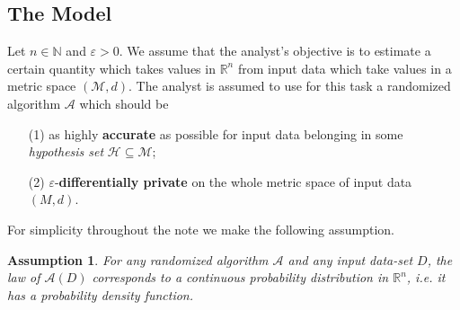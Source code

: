 \documentclass[12pt,a4paper]{article}
\newtheorem{assumption}{Assumption}
\numberwithin{equation}{section}
\numberwithin{equation}{section}
\renewcommand{\epsilon}{\varepsilon}
\newcommand{\1}{{\text{\Large $\mathfrak 1$}}}
\newcommand{\2}[1]{{\text{\Large $\mathfrak 1$}\!\left(#1\right)}}
\begin{document}
\subsection*{The Model}
Let $n \in \mathbb{N}$ and $\epsilon>0$. We assume that the analyst's objective is to estimate a certain quantity which takes values in $ \mathbb{R}^n$ from input data which take values in a metric space $(\mathcal{M},d)$. The analyst is assumed to use for this task a randomized algorithm $\mathcal{A}$ which should be \begin{itemize}
\item[(1)] as highly \textbf{accurate} as possible for input data belonging in some \textit{hypothesis set} $\mathcal{H} \subseteq \mathcal{M}$;

\item[(2)] $\epsilon$-\textbf{differentially private} on the whole metric space of input data $(M,d)$.
\end{itemize}For simplicity throughout the note we make the following assumption.\begin{assumption} For any randomized algorithm $\mathcal{A}$ and any input data-set $D$, the law of $\mathcal{A}(D)$ corresponds to a continuous probability distribution in $\mathbb{R}^n$, i.e. it has a probability density function. \end{assumption}
\end{document}
